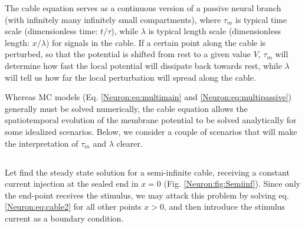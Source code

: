 The cable equation serves as a continuous version of a passive neural branch (with infinitely many infinitely small compartments), where $\tau_m$ is typical time scale (dimensionless time: $t/\tau$), while $\lambda$  is typical length scale  (dimensionless length: $x/\lambda$) for signals in the cable. If a certain point along the cable is perturbed, so that the potential is shifted from rest to a given value $V$, $\tau_m$ will determine how fast the local potential will dissipate back towards rest, while $\lambda$ will tell us how far the local perturbation will spread along the cable. 

Whereas MC models (Eq. \ref{Neuron:eq:multimain} and \ref{Neuron:eq:multipassive}) generally must be solved numerically, the cable equation allows the spatiotemporal evolution of the membrane potential to be solved analytically for some idealized scenarios. Below, we consider a couple of scenarios that will  make the interpretation of $\tau_m$ and $\lambda$ clearer. 


\subsection{}
\label{sec:Neuron:cableSS}
Let find the steady state solution for a semi-infinite cable, receiving a constant current injection at the sealed end in $x=0$ (Fig. \ref{Neuron:fig:Semiinf}). Since only the end-point receives the stimulus, we may attack this problem by solving eq. \ref{Neuron:eq:cable2} for all other points $x>0$, and then introduce the stimulus current as a boundary condition. 

